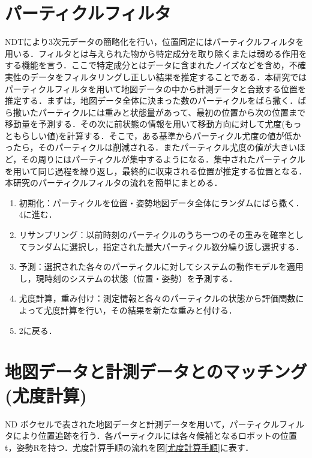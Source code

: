 \section{パーティクルフィルタ}
NDTにより3次元データの簡略化を行い，位置同定にはパーティクルフィルタを用いる．フィルタとは与えられた物から特定成分を取り除くまたは弱める作用をする機能を言う．ここで特定成分とはデータに含まれたノイズなどを含め，不確実性のデータをフィルタリングし正しい結果を推定することである．本研究ではパーティクルフィルタを用いて地図データの中から計測データと合致する位置を推定する．まずは，地図データ全体に決まった数のパーティクルをばら撒く．ばら撒いたパーティクルには重みと状態量があって、最初の位置から次の位置まで移動量を予測する．その次に前状態の情報を用いて移動方向に対して尤度(もっともらしい値)を計算する．そこで，ある基準からパーティクル尤度の値が低かったら，そのパーティクルは削減される．またパーティクル尤度の値が大きいほど，その周りにはパーティクルが集中するようになる．集中されたパーティクルを用いて同じ過程を繰り返し，最終的に収束される位置が推定する位置となる．本研究のパーティクルフィルタの流れを簡単にまとめる．
\begin{enumerate}
\item 初期化：パーティクルを位置・姿勢地図データ全体にランダムにばら撒く．4に進む．
\item リサンプリング：以前時刻のパーティクルのうち一つのその重みを確率としてランダムに選択し，指定された最大パーティクル数分繰り返し選択する．
\item 予測：選択された各々のパーティクルに対してシステムの動作モデルを適用し，現時刻のシステムの状態（位置・姿勢）を予測する．
\item 尤度計算，重み付け：測定情報と各々のパーティクルの状態から評価関数によって尤度計算を行い，その結果を新たな重みと付ける．
\item 2に戻る．
\end{enumerate}

\newpage
%
\section{地図データと計測データとのマッチング(尤度計算)}
ND ボクセルで表された地図データと計測データを用いて，パーティクルフィルタにより位置追跡を行う．各パーティクルには各々候補となるロボットの位置t，姿勢Rを持つ．尤度計算手順の流れを図{\ref{尤度計算手順}}に表す．\par

